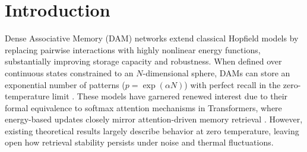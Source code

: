 \documentclass{article}
\theoremstyle{plain}
\theoremstyle{definition}
\theoremstyle{remark}
\begin{document}
\printAffiliationsAndNotice{}  %

\begin{abstract}
We derive thermodynamic phase boundaries for Dense Associative Memory networks with exponential capacity $p = e^{\alpha N}$, comparing Gaussian (LSE) and Epanechnikov (LSR) kernels. For continuous neurons on an $N$-sphere, the geometric entropy depends solely on the spherical geometry, not the kernel. Sufficiently sharp kernels achieve maximum theoretical capacity $\alpha = 0.5$ at zero temperature; below this threshold, a critical line separates retrieval from a spin-glass phase. Kernel sharpness introduces a trade-off between energetic stability and entropic cost: while LSR provides deeper energy minima, it exhibits a smaller retrieval region than LSE at finite temperature because enforcing higher alignment incurs a geometric entropy penalty that outweighs the energetic gain. The kernels also differ qualitatively in their thermal limits: LSR possesses a finite maximum retrieval temperature, whereas LSE permits retrieval at arbitrarily high temperatures for sufficiently low loads.
\end{abstract}

\section{Introduction}

Dense Associative Memory (DAM) networks extend classical Hopfield models by replacing pairwise interactions with highly nonlinear energy functions, substantially improving storage capacity and robustness. When defined over continuous states constrained to an $N$-dimensional sphere, DAMs can store an exponential number of patterns ($p = \exp(\alpha N)$) with perfect recall in the zero-temperature limit \citep{demircigil2017model,ramsauer2021hopfield,lucibello2024exponential}. These models have garnered renewed interest due to their formal equivalence to softmax attention mechanisms in Transformers, where energy-based updates closely mirror attention-driven memory retrieval \citep{ramsauer2021hopfield}. However, existing theoretical results largely describe behavior at zero temperature, leaving open how retrieval stability persists under noise and thermal fluctuations.
\end{document}
